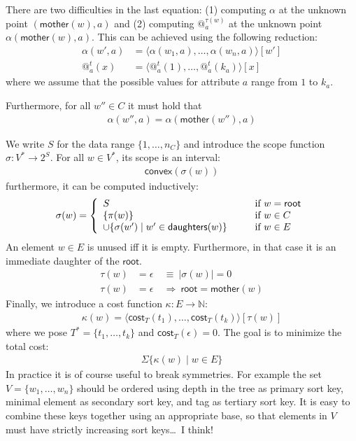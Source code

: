 \documentclass{article}
\makeatletter
\newcommand{\NAT}{{\mathbb N}}
\newcommand{\SET}[1]{{\{{#1}\}}}
\newcommand{\COST}{{\textsf{cost}}}
\newcommand{\TO}{\rightarrow}
\newcommand{\ROOT}{{\textsf{root}}}
\newcommand{\MOTHER}{{\textsf{mother}}}
\newcommand{\DAUGHTERS}{{\textsf{daughters}}}
\newcommand{\UNION}{\cup}
\newcommand{\TUP}[1]{{\langle{#1}\rangle}}
\newcommand{\EPS}{\epsilon}
\newcommand{\AT}[2]{@^{#1}_{#2}}
\newcommand{\CONVEX}{{\textsf{convex}}}
\newcommand{\IMPLIES}{\Rightarrow}
\makeatother
\begin{document}
There are two difficulties in the last equation: (1) computing
$\alpha$ at the unknown point $(\MOTHER(w),a)$ and (2) computing
$\AT{\tau(w)}{a}$ at the unknown point $\alpha(\MOTHER(w),a)$.  This
can be achieved using the following reduction:
\begin{align*}
\alpha(w',a) &= \TUP{\alpha(w_1,a),\ldots,\alpha(w_n,a)}[w']\\
\AT{t}{a}(x) &= \TUP{\AT{t}{a}(1),\ldots,\AT{t}{a}(k_a)}[x]
\end{align*}
where we assume that the possible values for attribute $a$ range from
$1$ to $k_a$.

Furthermore, for all $w''\in C$ it must hold that
\begin{gather*}
\alpha(w'',a) = \alpha(\MOTHER(w''),a)
\end{gather*}

We write $S$ for the data range $\SET{1,\ldots,n_C}$ and introduce the
scope function $\sigma:V^*\TO 2^S$.  For all $w\in V^*$, its scope is
an interval:
\begin{gather*}
\CONVEX(\sigma(w))
\end{gather*}
furthermore, it can be computed inductively:
\begin{gather*}
\sigma(w) = \left\{
\begin{array}{l@{\hspace{1cm}}l}
S & \text{if } w=\ROOT\\
\SET{\pi(w)} & \text{if } w\in C\\
{\UNION}\SET{\sigma(w')\mid w'\in\DAUGHTERS(w)} & \text{if } w\in E
\end{array}
\right.
\end{gather*}
An element $w\in E$ is unused iff it is empty.  Furthermore, in that
case it is an immediate daughter of the $\ROOT$.
\begin{align*}
\tau(w)&=\EPS\ &\equiv\ |\sigma(w)|=0\\
\tau(w)&=\EPS\ &\IMPLIES\ \ROOT=\MOTHER(w)
\end{align*}
Finally, we introduce a cost function $\kappa:E\TO\NAT$:
\begin{gather*}
\kappa(w) = \TUP{\COST_T(t_1),\ldots,\COST_T(t_k)}[\tau(w)]
\end{gather*}
where we pose $T^*=\SET{t_1,\ldots,t_k}$ and $\COST_T(\EPS)=0$.
The goal is to minimize the total cost:
\begin{gather*}
{\Sigma}\SET{\kappa(w)\mid w\in E}
\end{gather*}
In practice it is of course useful to break symmetries.  For example
the set $V=\SET{w_1,\ldots,w_n}$ should be ordered using depth in the
tree as primary sort key, minimal element as secondary sort key, and
tag as tertiary sort key.  It is easy to combine these keys together
using an appropriate base, so that elements in $V$ must have strictly
increasing sort keys\ldots\ I think!
\end{document}
